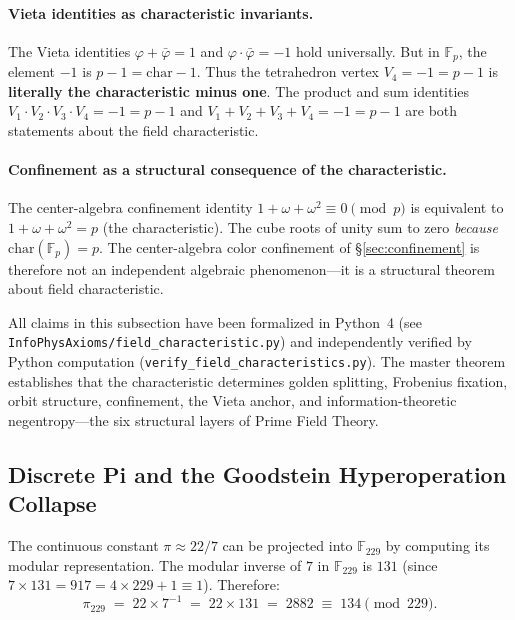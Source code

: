 \paragraph{Vieta identities as characteristic invariants.}
The Vieta identities $\varphi + \bar\varphi = 1$ and $\varphi \cdot \bar\varphi = -1$ hold universally. But in $\mathbb{F}_p$, the element $-1$ is $p - 1 = \mathrm{char} - 1$. Thus the tetrahedron vertex $V_4 = -1 = p - 1$ is \textbf{literally the characteristic minus one}. The product and sum identities $V_1 \cdot V_2 \cdot V_3 \cdot V_4 = -1 = p - 1$ and $V_1 + V_2 + V_3 + V_4 = -1 = p - 1$ are both statements about the field characteristic.

\paragraph{Confinement as a structural consequence of the characteristic.}
The center-algebra confinement identity $1 + \omega + \omega^2 \equiv 0 \pmod{p}$ is equivalent to $1 + \omega + \omega^2 = p$ (the characteristic). The cube roots of unity sum to zero \emph{because} $\mathrm{char}(\mathbb{F}_p) = p$. The center-algebra color confinement of \S\ref{sec:confinement} is therefore not an independent algebraic phenomenon---it is a structural theorem about field characteristic.

\begin{remark}
All claims in this subsection have been formalized in Python~4 (see \texttt{InfoPhysAxioms/field\_characteristic.py}) and independently verified by Python computation (\texttt{verify\_field\_characteristics.py}). The master theorem establishes that the characteristic determines golden splitting, Frobenius fixation, orbit structure, confinement, the Vieta anchor, and information-theoretic negentropy---the six structural layers of Prime Field Theory.
\end{remark}

\subsection{Discrete Pi and the Goodstein Hyperoperation Collapse}
\label{sec:pi_hyperops}

The continuous constant $\pi \approx 22/7$ can be projected into $\mathbb{F}_{229}$ by computing its modular representation. The modular inverse of $7$ in $\mathbb{F}_{229}$ is $131$ (since $7 \times 131 = 917 = 4 \times 229 + 1 \equiv 1$). Therefore:
\[
\pi_{229} \;=\; 22 \times 7^{-1} \;=\; 22 \times 131 \;=\; 2882 \;\equiv\; 134 \pmod{229}.
\]

